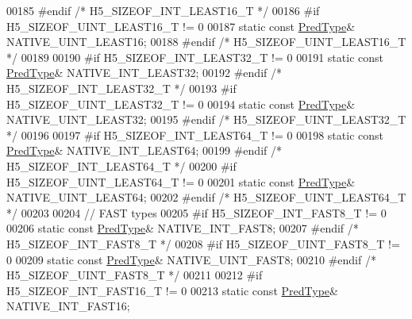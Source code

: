 \begin{DoxyCode}
00185 \textcolor{preprocessor}{#endif }\textcolor{comment}{/* H5\_SIZEOF\_INT\_LEAST16\_T */}\textcolor{preprocessor}{}
00186 \textcolor{preprocessor}{#if H5\_SIZEOF\_UINT\_LEAST16\_T != 0}
00187         \textcolor{keyword}{static} \textcolor{keyword}{const} \hyperlink{class_h5_1_1_pred_type}{PredType}& NATIVE\_UINT\_LEAST16;
00188 \textcolor{preprocessor}{#endif }\textcolor{comment}{/* H5\_SIZEOF\_UINT\_LEAST16\_T */}\textcolor{preprocessor}{}
00189 
00190 \textcolor{preprocessor}{#if H5\_SIZEOF\_INT\_LEAST32\_T != 0}
00191         \textcolor{keyword}{static} \textcolor{keyword}{const} \hyperlink{class_h5_1_1_pred_type}{PredType}& NATIVE\_INT\_LEAST32;
00192 \textcolor{preprocessor}{#endif }\textcolor{comment}{/* H5\_SIZEOF\_INT\_LEAST32\_T */}\textcolor{preprocessor}{}
00193 \textcolor{preprocessor}{#if H5\_SIZEOF\_UINT\_LEAST32\_T != 0}
00194         \textcolor{keyword}{static} \textcolor{keyword}{const} \hyperlink{class_h5_1_1_pred_type}{PredType}& NATIVE\_UINT\_LEAST32;
00195 \textcolor{preprocessor}{#endif }\textcolor{comment}{/* H5\_SIZEOF\_UINT\_LEAST32\_T */}\textcolor{preprocessor}{}
00196 
00197 \textcolor{preprocessor}{#if H5\_SIZEOF\_INT\_LEAST64\_T != 0}
00198         \textcolor{keyword}{static} \textcolor{keyword}{const} \hyperlink{class_h5_1_1_pred_type}{PredType}& NATIVE\_INT\_LEAST64;
00199 \textcolor{preprocessor}{#endif }\textcolor{comment}{/* H5\_SIZEOF\_INT\_LEAST64\_T */}\textcolor{preprocessor}{}
00200 \textcolor{preprocessor}{#if H5\_SIZEOF\_UINT\_LEAST64\_T != 0}
00201         \textcolor{keyword}{static} \textcolor{keyword}{const} \hyperlink{class_h5_1_1_pred_type}{PredType}& NATIVE\_UINT\_LEAST64;
00202 \textcolor{preprocessor}{#endif }\textcolor{comment}{/* H5\_SIZEOF\_UINT\_LEAST64\_T */}\textcolor{preprocessor}{}
00203 
00204 \textcolor{comment}{// FAST types}
00205 \textcolor{preprocessor}{#if H5\_SIZEOF\_INT\_FAST8\_T != 0}
00206         \textcolor{keyword}{static} \textcolor{keyword}{const} \hyperlink{class_h5_1_1_pred_type}{PredType}& NATIVE\_INT\_FAST8;
00207 \textcolor{preprocessor}{#endif }\textcolor{comment}{/* H5\_SIZEOF\_INT\_FAST8\_T */}\textcolor{preprocessor}{}
00208 \textcolor{preprocessor}{#if H5\_SIZEOF\_UINT\_FAST8\_T != 0}
00209         \textcolor{keyword}{static} \textcolor{keyword}{const} \hyperlink{class_h5_1_1_pred_type}{PredType}& NATIVE\_UINT\_FAST8;
00210 \textcolor{preprocessor}{#endif }\textcolor{comment}{/* H5\_SIZEOF\_UINT\_FAST8\_T */}\textcolor{preprocessor}{}
00211 
00212 \textcolor{preprocessor}{#if H5\_SIZEOF\_INT\_FAST16\_T != 0}
00213         \textcolor{keyword}{static} \textcolor{keyword}{const} \hyperlink{class_h5_1_1_pred_type}{PredType}& NATIVE\_INT\_FAST16;

\end{DoxyCode}
